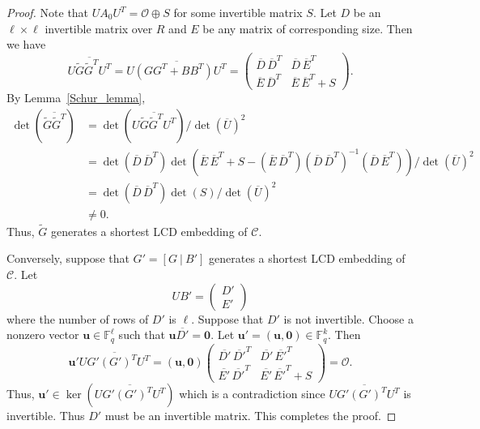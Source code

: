 \documentclass{article}
\theoremstyle{definition}
\theoremstyle{remark}
\begin{document}
\begin{proof}
    Note that $UA_0U^T=\mathcal{O}\oplus S$ for some invertible matrix $S$. Let $D$ be an $\ell\times \ell$ invertible matrix over $R$ and $E$ be any matrix of corresponding size. Then we have
    \[
    \overline{U\tilde{G}\tilde{G}^TU^T}=\overline{U(GG^T+BB^T)U^T}=\begin{pmatrix}
        \overline{D}\,\overline{D}^T & \overline{D}\,\overline{E}^T\\\overline{E}\,\overline{D}^T & \overline{E}\,\overline{E}^T+S
    \end{pmatrix}.
    \]
    By Lemma~\ref{Schur_lemma},
    \begin{align*}
    \det\left(\overline{\tilde{G}\tilde{G}^T}\right)
    &=\det\left(\overline{U\tilde{G}\tilde{G}^TU^T}\right)/\det(\overline{U})^2\\
    &=\det\left(\overline{D}\,\overline{D}^T\right)\det\left(\overline{E}\,\overline{E}^T+S-(\overline{E}\,\overline{D}^T)(\overline{D}\,\overline{D}^T)^{-1}(\overline{D}\,\overline{E}^T)\right)/\det(\overline{U})^2\\
    &=\det\left(\overline{D}\,\overline{D}^T\right)\det(S)/\det(\overline{U})^2\\
    &\ne 0.
    \end{align*}
    Thus, $\tilde{G}$ generates a shortest LCD embedding of $\mathcal{C}$.

    Conversely, suppose that $G'=[G~|~B']$ generates a shortest LCD embedding of $\mathcal{C}$. Let
    \[
    UB'=\begin{pmatrix}
        D'\\E'
    \end{pmatrix}
    \]
    where the number of rows of $D'$ is $\ell$. Suppose that $D'$ is not invertible. Choose a nonzero vector $\mathbf{u}\in \mathbb{F}_q^\ell$ such that $\mathbf{u}\overline{D'}=\mathbf{0}$. Let $\mathbf{u}'=(\mathbf{u}, \mathbf{0})\in \mathbb{F}_q^k$. Then
    \[
    \mathbf{u}'\overline{UG'(G')^TU^T}=(\mathbf{u}, \mathbf{0})\begin{pmatrix}
        \overline{D'}\,\overline{D'}^T & \overline{D'}\,\overline{E'}^T\\\overline{E'}\,\overline{D'}^T & \overline{E'}\,\overline{E'}^T+S
    \end{pmatrix}=\mathcal{O}.
    \]
    Thus, $\mathbf{u}'\in \ker\left(\overline{UG'(G')^TU^T}\right)$ which is a contradiction since $\overline{UG'(G')^TU^T}$ is invertible. Thus $D'$ must be an invertible matrix. This completes the proof.
\end{proof}
\end{document}
